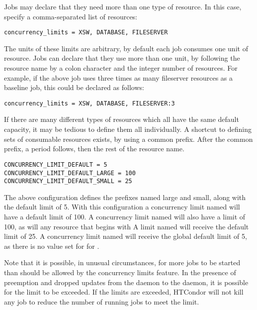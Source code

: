 Jobs may declare that they need more than one type of resource.
In this case, specify a comma-separated list of resources:

\begin{verbatim}
concurrency_limits = XSW, DATABASE, FILESERVER
\end{verbatim}

The units of these limits are arbitrary, by default each job consumes
one unit of resource.  Jobs can declare that they use more than one
unit, by following the resource name by a colon character and the
integer number of resources.  For example, if the above job
uses three times as many fileserver resources as a baseline job,
this could be declared as follows:

\begin{verbatim}
concurrency_limits = XSW, DATABASE, FILESERVER:3
\end{verbatim}

If there are many different types of resources which all have the same
default capacity, it may be tedious to define them all individually.
A shortcut to defining sets of consumable resources exists, by using a
common prefix.  After the common prefix, a period follows, then the
rest of the resource name.

\begin{verbatim}
CONCURRENCY_LIMIT_DEFAULT = 5
CONCURRENCY_LIMIT_DEFAULT_LARGE = 100
CONCURRENCY_LIMIT_DEFAULT_SMALL = 25
\end{verbatim}

The above configuration defines the prefixes named large and small,
along with the default limit of 5.  With this configuration a
concurrency limit named  will have a default
limit of 100.  A concurrency limit named  will
also have a limit of 100, as will any resource that begins with
  A limit named  will receive
the default limit of 25.  A concurrency limit named
 will receive the global default limit of 5, as
there is no value set for for
.

Note that it is possible, in unusual circumstances, for more jobs to
be started than should be allowed by the concurrency limits feature.
In the presence of preemption and dropped updates from the
 daemon to the  daemon, it is
possible for the limit to be exceeded. If the limits are exceeded,
HTCondor will not kill any job to reduce the number of running jobs to
meet the limit.
